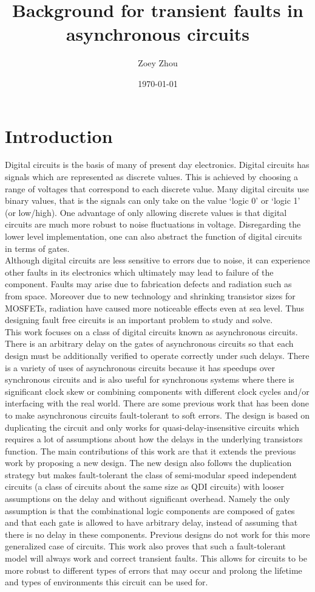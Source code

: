 \documentclass[12pt]{report}
\title{Background for transient faults in asynchronous circuits}
\author{Zoey Zhou}
\date{\today}
\begin{document}
\chapter{Introduction}
Digital circuits is the basis of many of present day electronics.  Digital circuits has signals which are represented as discrete values.  This is achieved by choosing a range of voltages that correspond to each discrete value.  Many digital circuits use binary values, that is the signals can only take on the value `logic 0' or `logic 1' (or low/high).  One advantage of only allowing discrete values is that digital circuits are much more robust to noise fluctuations in voltage.  Disregarding the lower level implementation, one can also abstract the function of digital circuits in terms of gates.\\

Although digital circuits are less sensitive to errors due to noise, it can experience other faults in its electronics which ultimately may lead to failure of the component.  Faults may arise due to fabrication defects and radiation such as from space.  Moreover due to new technology and shrinking transistor sizes for MOSFETs, radiation have caused more noticeable effects even at sea level. Thus designing fault free circuits is an important problem to study and solve.  \\  %

This work focuses on a class of digital circuits known as asynchronous circuits.  There is an arbitrary delay on the gates of asynchronous circuits so that each design must be additionally verified to operate correctly under such delays.  There is a variety of uses of asynchronous circuits because it has speedups over synchronous circuits and is also useful for synchronous systems where there is significant clock skew or combining components with different clock cycles and/or interfacing with the real world.  There are some previous work that has been done to make asynchronous circuits fault-tolerant to soft errors.  The design is based on duplicating the circuit and only works for quasi-delay-insensitive circuits which requires a lot of assumptions about how the delays in the underlying transistors function.  The main contributions of this work are that it extends the previous work by proposing a new design.  The new design also follows the duplication strategy but makes fault-tolerant the class of semi-modular speed independent circuits (a class of circuits about the same size as QDI circuits) with looser assumptions on the delay and without significant overhead.  Namely the only assumption is that the combinational logic components are composed of gates and that each gate is allowed to have arbitrary delay, instead of assuming that there is no delay in these components.  Previous designs do not work for this more generalized case of circuits.  This work also proves that such a fault-tolerant model will always work and correct transient faults.  This allows for circuits to be more robust to different types of errors that may occur and prolong the lifetime and types of environments this circuit can be used for.
\end{document}
